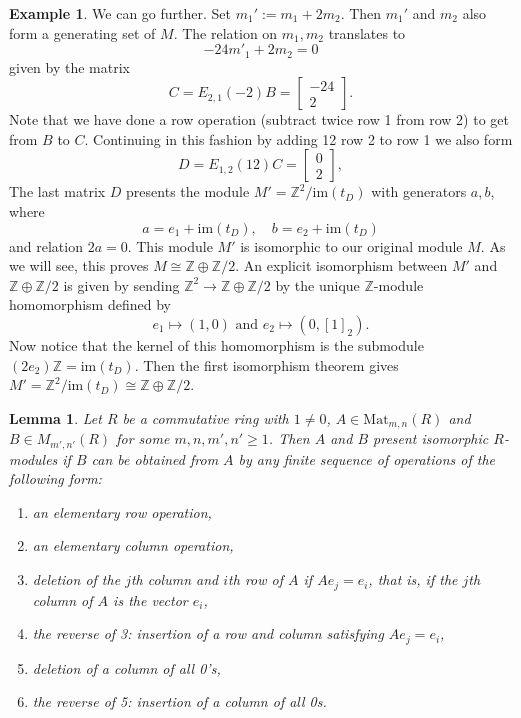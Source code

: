 \documentclass[12pt]{report}
\newtheorem{lemma}[theorem]{Lemma}
\numberwithin{equation}{section}
\numberwithin{theorem}{chapter}
\theoremstyle{definition}
\newtheorem{example}[theorem]{Example}
\newtheorem*{basic properties}{Basic Properties}
\newtheorem*{Important Remark}{Important Remark}
\begin{document}
\begin{example}
We can go further. Set $m_1' := m_1 + 2m_2$. Then $m_1'$ and $m_2$ also form a generating set of $M$. The relation on $m_1, m_2$ translates to
$$
-24m'_1  +2 m_2 = 0
$$
given by the matrix
$$
C = E_{2,1}(-2)B=
\begin{bmatrix} -24 \\ 2
\end{bmatrix}.
$$
Note that we have done a row operation (subtract twice row 1 from row 2) to get from $B$ to $C$.
Continuing in this fashion by adding 12 row 2 to row 1 we also form 
$$
D = E_{1,2}(12)C=
\begin{bmatrix} 0 \\ 2
\end{bmatrix},
$$
The last matrix $D$ presents the module $M'=\mathbb{Z}^2/\mathrm{im}(t_D)$ with generators $a, b$, where
$$a=e_1+\mathrm{im}(t_D), \quad b=e_2+\mathrm{im}(t_D)$$ 
and relation $2a = 0$. This module $M'$ is isomorphic to our original module $M$. As we will see, this proves $M \cong \mathbb{Z} \oplus \mathbb{Z}/2$. An explicit isomorphism between $M'$ and $\mathbb{Z} \oplus \mathbb{Z}/2$ is given by sending $\mathbb{Z}^2\to \mathbb{Z} \oplus \mathbb{Z}/2$ by the unique $\mathbb{Z}$-module homomorphism defined by 
$$e_1\mapsto (1,0) \textrm{ and } e_2\mapsto (0,[1]_2).$$ 
Now notice that the kernel of this homomorphism is the submodule $(2e_2)\mathbb{Z}=\mathrm{im}(t_D)$. Then the first isomorphism theorem gives
$M'=\mathbb{Z}^2/\mathrm{im}(t_D)\cong \mathbb{Z} \oplus \mathbb{Z}/2$.
\end{example}




\begin{lemma} 
Let $R$ be a commutative ring with $1 \neq 0$, $A \in \mathrm{Mat}_{m,n}(R)$ and $B \in M_{m',n'}(R)$ for some $m,n,m',n' \geqslant 1$. Then $A$ and $B$ present isomorphic $R$-modules if $B$ can be obtained from $A$ by any finite sequence of operations of the following form: 
\begin{enumerate}[label=(\arabic*),leftmargin=20pt]
\item an elementary row operation, 
\item an elementary column operation,
\item deletion of the $j$th column and $i$th row of $A$ if $Ae_j = e_i$, that is, if the $j$th column of $A$ is the vector $e_i$, 
\item the reverse of 3: insertion of a row and column satisfying $Ae_j = e_i$, 
\item deletion of a column of all 0's, 
\item the reverse of 5: insertion of a column of all 0s.
 \end{enumerate}
 \end{lemma}
 
\end{document}
